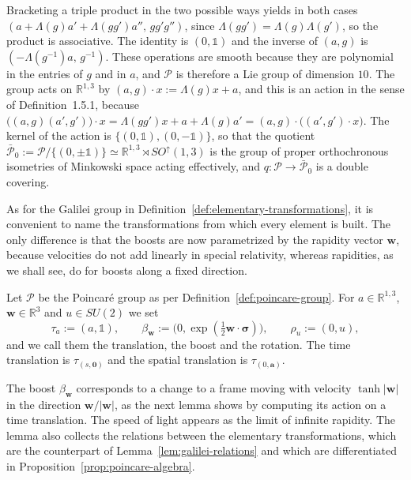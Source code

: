 	\begin{remark}\label{rem:poincare-group}
		Bracketing a triple product in the two possible ways yields in both cases $(a+\Lambda(g)a'+\Lambda(gg')a'',\,gg'g'')$, since $\Lambda(gg')=\Lambda(g)\Lambda(g')$, so the product is associative. The identity is $(0,\mathbb{1})$ and the inverse of $(a,g)$ is $(-\Lambda(g^{-1})a,\,g^{-1})$. These operations are smooth because they are polynomial in the entries of $g$ and in $a$, and $\mathcal{P}$ is therefore a Lie group of dimension $10$. The group acts on $\mathbb{R}^{1,3}$ by $(a,g)\cdot x:=\Lambda(g)x+a$, and this is an action in the sense of Definition~1.5.1, because $\big((a,g)(a',g')\big)\cdot x=\Lambda(gg')x+a+\Lambda(g)a'=(a,g)\cdot\big((a',g')\cdot x\big)$. The kernel of the action is $\{(0,\mathbb{1}),(0,-\mathbb{1})\}$, so that the quotient $\bar{\mathcal{P}}_0:=\mathcal{P}/\{(0,\pm\mathbb{1})\}\simeq\mathbb{R}^{1,3}\rtimes SO^\uparrow(1,3)$ is the group of proper orthochronous isometries of Minkowski space acting effectively, and $q:\mathcal{P}\to\bar{\mathcal{P}}_0$ is a double covering.
	\end{remark}
	
	As for the Galilei group in Definition~\ref{def:elementary-transformations}, it is convenient to name the transformations from which every element is built. The only difference is that the boosts are now parametrized by the rapidity vector $\mathbf{w}$, because velocities do not add linearly in special relativity, whereas rapidities, as we shall see, do for boosts along a fixed direction.
	
	\begin{definition}\label{def:poincare-elementary}
		Let $\mathcal{P}$ be the Poincar\'e group as per Definition~\ref{def:poincare-group}. For $a\in\mathbb{R}^{1,3}$, $\mathbf{w}\in\mathbb{R}^3$ and $u\in SU(2)$ we set
		\begin{equation}
			\tau_a:=(a,\mathbb{1}),\qquad \beta_{\mathbf{w}}:=\big(0,\exp(\tfrac12\mathbf{w}\cdot\boldsymbol{\sigma})\big),\qquad \rho_u:=(0,u),
		\end{equation}
		and we call them the translation, the boost and the rotation. The time translation is $\tau_{(s,\mathbf{0})}$ and the spatial translation is $\tau_{(0,\mathbf{a})}$.
	\end{definition}
	
	The boost $\beta_{\mathbf{w}}$ corresponds to a change to a frame moving with velocity $\tanh|\mathbf{w}|$ in the direction $\mathbf{w}/|\mathbf{w}|$, as the next lemma shows by computing its action on a time translation. The speed of light appears as the limit of infinite rapidity. The lemma also collects the relations between the elementary transformations, which are the counterpart of Lemma~\ref{lem:galilei-relations} and which are differentiated in Proposition~\ref{prop:poincare-algebra}.
	
